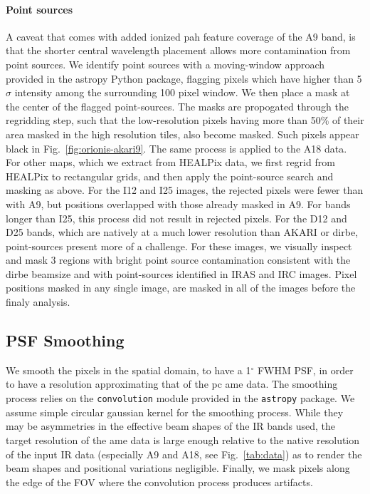         \paragraph{Point sources}
          A caveat that comes with added ionized \acrshort{pah} feature coverage of the A9 band, is that the shorter central wavelength placement allows more contamination from point sources. We identify point sources with a moving-window approach provided in the astropy Python package, flagging pixels which have higher than 5$\sigma$ intensity among the surrounding 100 pixel window. We then place a mask at the center of the flagged point-sources. The masks are propogated through the regridding step, such that the low-resolution pixels having more than 50\% of their area masked in the high resolution tiles, also become masked. Such pixels appear black in Fig.~\ref{fig:orionis-akari9}. The same process is applied to the A18 data. For other maps, which we extract from HEALPix data, we first regrid from HEALPix to rectangular grids, and then apply the point-source search and masking as above. For the I12 and I25 images, the rejected pixels were fewer than with A9, but positions overlapped with those already masked in A9. For bands longer than I25, this process did not result in rejected pixels. For the D12 and D25 bands, which are natively at a much lower resolution than AKARI or \acrshort{dirbe}, point-sources present more of a challenge. For these images, we visually inspect and mask 3 regions with bright point source contamination consistent with the \acrshort{dirbe} beamsize and with point-sources identified in IRAS and IRC images. Pixel positions masked in any single image, are masked in all of the images before the finaly analysis.


        \subsection{PSF Smoothing}
          We smooth the pixels in the spatial domain, to have a 1$^{\circ}$ FWHM PSF, in order to have a resolution approximating that of the \acrshort{pc} \acrshort{ame} data.
          The smoothing process relies on the {\tt convolution} module provided in the {\tt astropy} package. We assume simple circular gaussian kernel for the smoothing process. While they may be asymmetries in the effective beam shapes of the IR bands used, the target resolution of the \acrshort{ame} data is large enough relative to the native resolution of the input IR data (especially A9 and A18, see Fig.~\ref{tab:data}) as to render the beam shapes and positional variations negligible. Finally, we mask pixels along the edge of the FOV where the convolution process produces artifacts.

